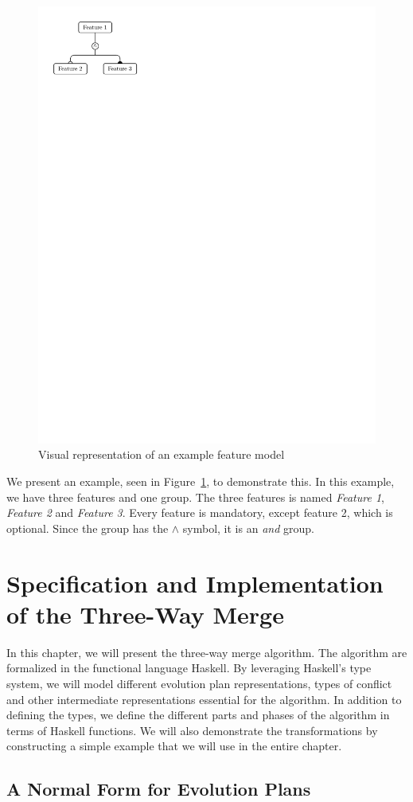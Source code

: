 \documentclass[a4paper,english]{ifimaster}
\begin{document}
\begin{figure}[htpb]
  \centering
  \includegraphics[width=0.4\linewidth]{visual_example.pdf}
  \caption{Visual representation of an example feature model}%
  \label{fig:visual_example}
\end{figure}

We present an example, seen in Figure~\ref{fig:visual_example}, to demonstrate this. In this example, we have three features and one group. The three features is named \textit{Feature 1}, \textit{Feature 2} and \textit{Feature 3}. Every feature is mandatory, except feature 2, which is optional. Since the group has the $\land$ symbol, it is an \textit{and} group.

\chapter{Specification and Implementation of the Three-Way Merge}%
\label{cha:specification_and_implementation_of_the_three_way_merge_algorithm}

In this chapter, we will present the three-way merge algorithm. The algorithm are formalized in the functional language Haskell. By leveraging Haskell's type system, we will model different evolution plan representations, types of conflict and other intermediate representations essential for the algorithm. In addition to defining the types, we define the different parts and phases of the algorithm in terms of Haskell functions. We will also demonstrate the transformations by constructing a simple example that we will use in the entire chapter.

\section{A Normal Form for Evolution Plans}%
\label{sec:defining_a_normal_form_for_evolution_plans}
\end{document}
